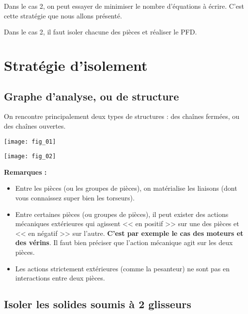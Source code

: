 Dans le cas 2, on peut essayer de minimiser le nombre d'équations à écrire. C'est cette stratégie que nous allons présenté.

Dans le cas 2, il faut isoler chacune des pièces et réaliser le PFD. 




\section{Stratégie d'isolement}

\subsection{Graphe d'analyse, ou de structure}

On rencontre principalement deux types de structures : des chaînes fermées, ou des chaînes ouvertes.

\begin{figure*}[!ht]
\begin{minipage}[c]{.4\linewidth}
\begin{center}
\texttt{[image: fig\_01]}
\end{center}
\end{minipage}
\hfill
\begin{minipage}[c]{.55\linewidth}
\begin{center}
\texttt{[image: fig\_02]}
\end{center}
\end{minipage}
\end{figure*}

\textbf{Remarques :}
\begin{itemize}
\item Entre les pièces (ou les groupes de pièces), on matérialise les liaisons (dont vous connaissez super bien les torseurs).
\item Entre certaines pièces (ou groupes de pièces), il peut exister des actions mécaniques extérieures qui agissent << en positif >> sur une des pièces et << en négatif >> sur l'autre. \textbf{C'est par exemple le cas des moteurs et des vérins}. Il faut bien préciser que l'action mécanique agit sur les deux pièces.
\item Les actions strictement extérieures (comme la pesanteur) ne sont pas en interactions entre deux pièces.
\end{itemize}


\subsection{Isoler les solides soumis à 2 glisseurs}

